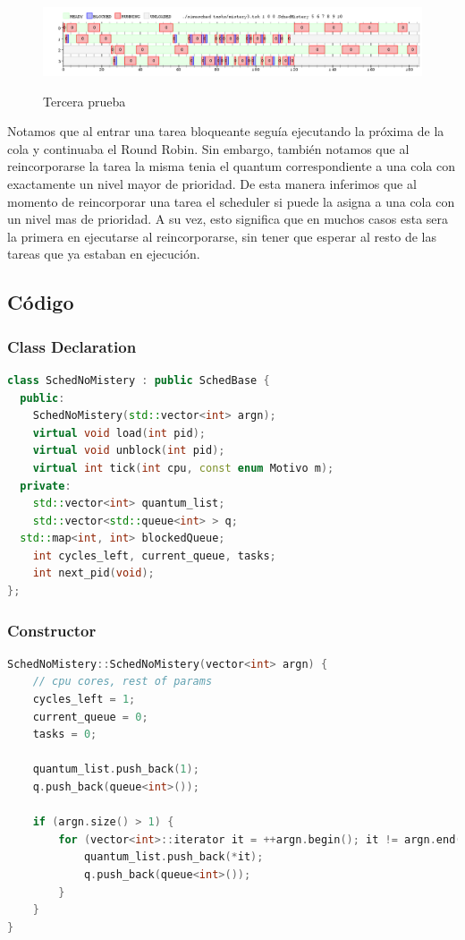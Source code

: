 \begin{figure}[h]
    \includegraphics[width=\linewidth]{images/mist3.png}
    \label{fig:Task Consola}
    \caption{Tercera prueba}
\end{figure}

Notamos que al entrar una tarea bloqueante seguía ejecutando la próxima de la cola y continuaba el Round Robin. Sin embargo, también notamos que al reincorporarse la tarea la misma tenia el quantum correspondiente a una cola con exactamente un nivel mayor de prioridad. De esta manera inferimos que al momento de reincorporar una tarea el scheduler si puede la asigna a una cola con un nivel mas de prioridad. A su vez, esto significa que en muchos casos esta sera la primera en ejecutarse al reincorporarse, sin tener que esperar al resto de las tareas que ya estaban en ejecución.

\subsection{Código}

\subsubsection{Class Declaration}
\begin{lstlisting}[language=C++, breaklines=true]
class SchedNoMistery : public SchedBase {
  public:
    SchedNoMistery(std::vector<int> argn);
    virtual void load(int pid);
    virtual void unblock(int pid);
    virtual int tick(int cpu, const enum Motivo m);
  private:
	std::vector<int> quantum_list;
	std::vector<std::queue<int> > q;
  std::map<int, int> blockedQueue;
	int cycles_left, current_queue, tasks;
	int next_pid(void);
};
\end{lstlisting}


\subsubsection{Constructor}
\begin{lstlisting}[language=C++, breaklines=true]
SchedNoMistery::SchedNoMistery(vector<int> argn) {
	// cpu cores, rest of params
	cycles_left = 1;
	current_queue = 0;
	tasks = 0;

	quantum_list.push_back(1);
	q.push_back(queue<int>());

	if (argn.size() > 1) {
		for (vector<int>::iterator it = ++argn.begin(); it != argn.end(); ++it) {
			quantum_list.push_back(*it);
			q.push_back(queue<int>());
		}
	}
}
\end{lstlisting}


